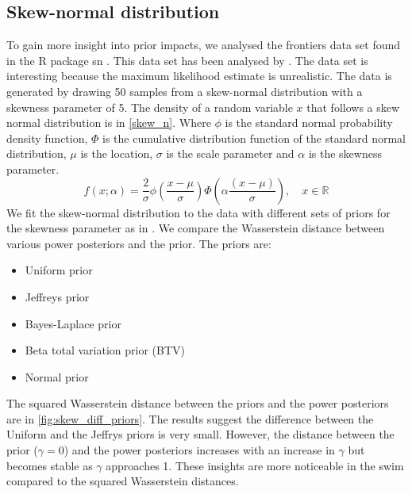 \documentclass[12pt]{article}
\begin{document}
\subsection{Skew-normal distribution}
To gain more insight into prior impacts, we analysed the frontiers data set
found in the R package sn \citep{azzalini2023}. This data set has been analysed
by \cite{ghaderinezhadWassersteinImpactMeasure2022}. The data set is
interesting because the maximum likelihood estimate is unrealistic. The data is
generated by drawing 50 samples from a skew-normal distribution with a skewness
parameter of 5. The density of a random variable $x$ that follows a skew normal
distribution \citep{azzaliniClassD1985} is in \cref{skew_n}. Where $\phi$ is
the standard normal probability density function, $\Phi$ is the cumulative
distribution function of the standard normal distribution, $\mu$ is the
location, $\sigma$ is the scale parameter and $\alpha$ is the skewness
parameter.
\begin{equation}
    f(x; \alpha) = \frac{2}{\sigma} \phi \left( \frac{x - \mu}{\sigma} \right) \Phi \left( \alpha \frac{(x - \mu)}{\sigma}  \right), \quad x \in \mathbb{R}
    \label{skew_n}
\end{equation}
We fit the skew-normal distribution to the data with different sets of priors
for the skewness parameter as in
\cite{ghaderinezhadWassersteinImpactMeasure2022}. We compare the Wasserstein
distance between various power posteriors and the prior. The priors are: 
\begin{itemize}
\item Uniform prior
\item Jeffreys prior
\item Bayes-Laplace prior
\item Beta total variation prior (BTV)
\item Normal prior
\end{itemize}
The squared Wasserstein distance between the priors and the power posteriors
are in \cref{fig:skew_diff_priors}. The results suggest the difference between
the Uniform and the Jeffrys priors is very small. However, the distance between
the prior ($\gamma=0$) and the power posteriors increases with an increase in
$\gamma$ but becomes stable as $\gamma$ approaches 1. These insights are more
noticeable in the \gls{swim} compared to the squared Wasserstein distances.
\end{document}
